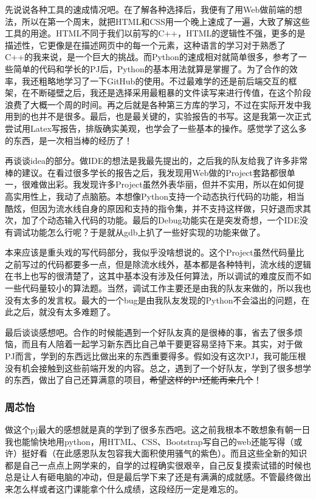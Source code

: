 \documentclass[a4paper,11pt,UTF8]{ctexart}
\begin{document}
\begin{sloppypar}
先说说各种工具的速成情况吧。在了解各种选择后，我便有了用Web做前端的想法，所以在第一个周末，就把HTML和CSS用一个晚上速成了一遍，大致了解这些工具的用途。HTML不同于我们以前写的C++，HTML的逻辑性不强，更多的是描述性，它更像是在描述网页中的每一个元素，这种语言的学习对于熟悉了C++的我来说，是一个巨大的挑战。而Python的速成相对就简单很多，参考了一些简单的代码和学长的PJ后，Python的基本用法就算是掌握了。为了合作的效率，我还粗略地学习了一下GitHub的使用。不过最难学的还是前后端交互的框架，在不断碰壁之后，我还是选择采用最粗暴的文件读写来进行传值，在这个阶段浪费了大概一个周的时间。再之后就是各种第三方库的学习，不过在实际开发中我用到的也并不是很多。最后，也是最关键的，实验报告的书写。这是我第一次正式尝试用Latex写报告，排版确实美观，也学会了一些基本的操作。感觉学了这么多的东西，是一次相当棒的经历了！

再谈谈idea的部分。做IDE的想法是我最先提出的，之后我的队友给我了许多非常棒的建议。在看过很多学长的报告之后，我发现用Web做的Project套路都很单一，很难做出彩。我发现许多Project虽然外表华丽，但并不实用，所以在如何提高实用性上，我动了点脑筋。本想像Python支持一个动态执行代码的功能，相当酷炫，但因为流水线自身的原因和支持的指令集，并不支持这样做，只好退而求其次，加了个动态输入代码的功能。最后的Debug功能实在是突发奇想，一个IDE没有调试功能怎么行呢？于是就从gdb上扒了一些好实现的功能来做了。

本来应该是重头戏的写代码部分，我似乎没啥想说的。这个Project虽然代码量比之前写过的代码都要多一点，但是除流水线外，基本都是各种特判，流水线的逻辑在书上也写的很清楚了，这其中基本没有涉及任何算法，所以调试的难度反而不如一些代码量较小的算法题。当然，调试工作主要还是由我的队友来做的，所以我也没有太多的发言权。最大的一个bug是由我队友发现的Python不会溢出的问题，在此之后，就没有太多难题了。

最后谈谈感想吧。合作的时候能遇到一个好队友真的是很棒的事，省去了很多烦恼，而且有人陪着一起学习新东西比自己单干要更容易坚持下来。其实，对于做PJ而言，学到的东西远比做出来的东西重要得多。假如没有这次PJ，我可能压根没有机会接触到这些前端开发的内容。总之，遇到了一个好队友，学到了很多想学的东西，做出了自己还算满意的项目，\sout{希望这样的PJ还能再来几个}！

\subsubsection{周芯怡} 

做这个pj最大的感想就是真的学到了很多东西吧。这之前我根本不敢想象有朝一日我也能愉快地用python，用HTML、CSS、Bootstrap写自己的web还能写得（或许）挺好看（在此感恩队友包容我大面积使用骚气的紫色）。而且这些全新的知识都是自己一点点上网学来的，自学的过程确实很艰辛，自己反复摸索试错的时候也总是让人有砸电脑的冲动，但是最后学下来了还是有满满的成就感。不管最终做出来怎么样或者这门课能拿个什么成绩，这段经历一定是难忘的。


\end{sloppypar}
\end{document}

